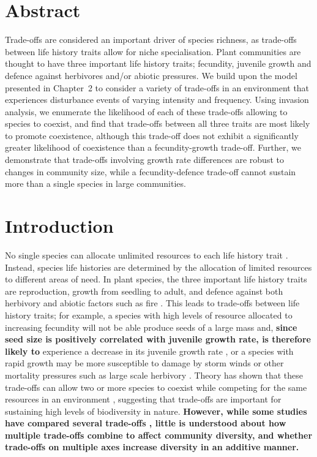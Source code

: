 \newpage
{}
\vspace*{\fill}
\section*{Abstract}
Trade-offs are considered an important driver of species richness, as trade-offs between life history traits allow for niche specialisation. Plant communities are thought to have three important life history traits; fecundity, juvenile growth and defence against herbivores and/or abiotic pressures. We build upon the model presented in Chapter~2 to consider a variety of trade-offs in an environment that experiences disturbance events of varying intensity and frequency. Using invasion analysis, we enumerate the likelihood of each of these trade-offs allowing to species to coexist, and find that trade-offs between all three traits are most likely to promote coexistence, although this trade-off does not exhibit a significantly greater likelihood of coexistence than a fecundity-growth trade-off. Further, we demonstrate that trade-offs involving growth rate differences are robust to changes in community size, while a fecundity-defence trade-off cannot sustain more than a single species in large communities. 
\vspace*{\fill}
\newpage

\section{Introduction}
No single species can allocate unlimited resources to each life history trait \citep{law1979optimal,tilman1982resource}. Instead, species life histories are determined by the allocation of limited resources to different areas of need. In plant species, the three important life history traits are reproduction, growth from seedling to adult, and defence against both herbivory and abiotic factors such as fire \citep{bazzaz1987allocating}. This leads to trade-offs between life history traits; for example, a species with high levels of resource allocated to increasing fecundity will not be able produce seeds of a large mass \citep{turnbull1999seed} and, \textbf{since seed size is positively correlated with juvenile growth rate, is therefore likely to} experience a decrease in its juvenile growth rate \citep{gross1984effects}, or a species with rapid growth may be more susceptible to damage by storm winds or other mortality pressures such as large scale herbivory \citep[e.g.][]{wright2010functional,fine2006growth}. Theory has shown that these trade-offs can allow two or more species to coexist while competing for  the same resources in an environment \citep[e.g.][]{kisdi2003coexistence,levins1971regional,bonsall2004life}, suggesting that trade-offs are important for sustaining high levels of biodiversity in nature. \textbf{However, while some studies have compared several trade-offs \citep[e.g.][]{tilman1990constraints,grime1977evidence}, little is understood about how multiple trade-offs combine to affect community diversity, and whether trade-offs on multiple axes increase diversity in an additive manner.}

